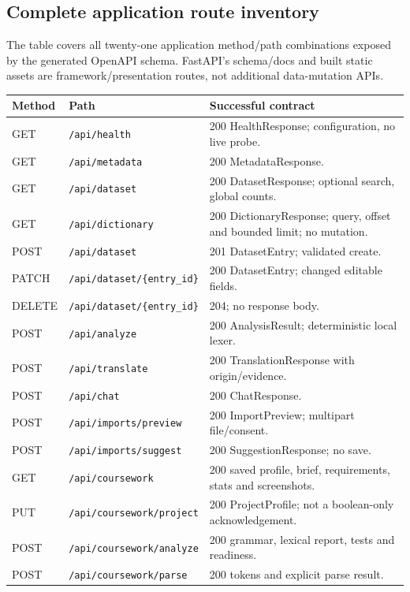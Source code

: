 \documentclass[11pt,a4paper]{article}
\begin{document}
\subsection{Complete application route inventory}
The table covers all twenty-one application method/path combinations exposed by
the generated OpenAPI schema. FastAPI's schema/docs and built static assets
are framework/presentation routes, not additional data-mutation APIs.
\begingroup\small
\begin{longtable}{L{1.6cm}L{6.6cm}L{6.4cm}}
\toprule\textbf{Method} & \textbf{Path} & \textbf{Successful contract}\\\midrule\endhead
GET & \nolinkurl{/api/health} & 200 HealthResponse; configuration, no live probe.\\
GET & \nolinkurl{/api/metadata} & 200 MetadataResponse.\\
GET & \nolinkurl{/api/dataset} & 200 DatasetResponse; optional search, global counts.\\
GET & \nolinkurl{/api/dictionary} & 200 DictionaryResponse; query, offset and bounded limit; no mutation.\\
POST & \nolinkurl{/api/dataset} & 201 DatasetEntry; validated create.\\
PATCH & \nolinkurl{/api/dataset/{entry_id}} & 200 DatasetEntry; changed editable fields.\\
DELETE & \nolinkurl{/api/dataset/{entry_id}} & 204; no response body.\\
POST & \nolinkurl{/api/analyze} & 200 AnalysisResult; deterministic local lexer.\\
POST & \nolinkurl{/api/translate} & 200 TranslationResponse with origin/evidence.\\
POST & \nolinkurl{/api/chat} & 200 ChatResponse.\\
POST & \nolinkurl{/api/imports/preview} & 200 ImportPreview; multipart file/consent.\\
POST & \nolinkurl{/api/imports/suggest} & 200 SuggestionResponse; no save.\\
GET & \nolinkurl{/api/coursework} & 200 saved profile, brief, requirements, stats and screenshots.\\
PUT & \nolinkurl{/api/coursework/project} & 200 ProjectProfile; not a boolean-only acknowledgement.\\
POST & \nolinkurl{/api/coursework/analyze} & 200 grammar, lexical report, tests and readiness.\\
POST & \nolinkurl{/api/coursework/parse} & 200 tokens and explicit parse result.\\

\end{longtable}
\end{document}
